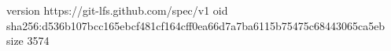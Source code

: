 version https://git-lfs.github.com/spec/v1
oid sha256:d536b107bcc165ebcf481cf164cff0ea66d7a7ba6115b75475c68443065ca5eb
size 3574
